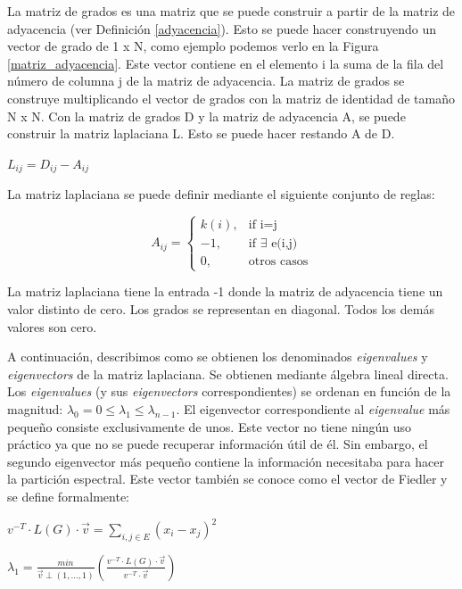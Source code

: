 \begin{mydef}\label{laplaciana}
	La matriz de grados es una matriz que se puede construir a partir de la matriz de adyacencia (ver Definición \ref{adyacencia}). Esto se puede hacer construyendo un vector de grado de 1 x N, como ejemplo podemos verlo en la Figura \ref{matriz_adyacencia}. Este vector contiene en el elemento i la suma de la fila del número de columna j de la matriz de adyacencia. La matriz de grados se construye multiplicando el vector de grados con la matriz de identidad de tamaño N x N. Con la matriz de grados D y la matriz de adyacencia A, se puede construir la matriz laplaciana L. Esto se puede hacer restando A de D.
	\begin{center}
		$L_{ij} = D_{ij} - A_{ij}$
	\end{center}
	La matriz laplaciana se puede definir mediante el siguiente conjunto de reglas:
	\begin{center}
		$$
		A_{ij} = 
		\begin{cases}
		k(i), & \text{if i=j} \\
		-1, & \text{if $\exists$ e(i,j)} \\
		0, & \text{otros casos}
		\end{cases}
		$$
	\end{center}
	La matriz laplaciana tiene la entrada -1 donde la matriz de adyacencia tiene un valor distinto de cero. Los grados se representan en diagonal. Todos los demás valores son cero.
\end{mydef}

A continuación, describimos como se obtienen los denominados \textit{eigenvalues} y \textit{eigenvectors} de la matriz laplaciana. Se obtienen mediante álgebra lineal directa. Los \textit{eigenvalues} (y sus \textit{eigenvectors} correspondientes) se ordenan en función de la magnitud: $\lambda_{0} = 0 \leq \lambda_{1} \leq \lambda_{n-1}$. El eigenvector correspondiente al \textit{eigenvalue} más pequeño consiste exclusivamente de unos. Este vector no tiene ningún uso práctico ya que no se puede recuperar información útil de él. Sin embargo, el segundo eigenvector más pequeño contiene la información necesitaba para hacer la partición espectral. Este vector también se conoce como el vector de Fiedler\cite{Fiedler} y se define formalmente:

\begin{center}
	$v^{-T} \cdot L(G) \cdot \vec{v} = \sum_{i,j \in E}^{} (x_{i} - x_{j})^2$
\end{center}

\begin{center}
	$\lambda_{1} = \frac{min}{\vec{v} \perp (1, ..., 1)} \left(\frac{v^{-T} \cdot L(G) \cdot \vec{v}}{v^{-T} \cdot \vec{v}} \right)$
\end{center}

